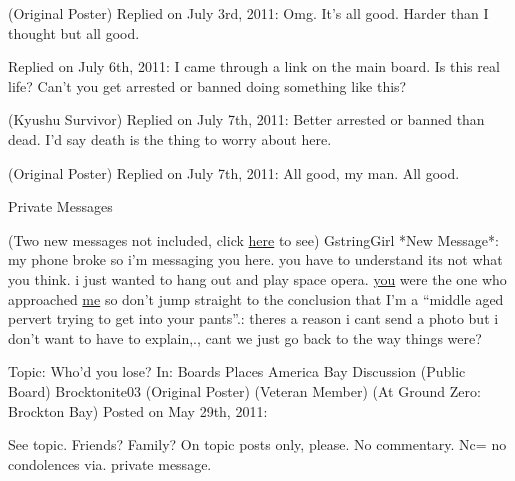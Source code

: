 \blacktriangleright  {}(Original Poster)
Replied on July 3rd, 2011:
Omg.
It's all good.
Harder than I thought but all good.



\blacktriangleright {}
Replied on July 6th, 2011:
I came through a link on the main board.  Is this real life?  Can't you get arrested or banned doing something like this?



\blacktriangleright {} (Kyushu Survivor)
Replied on July 7th, 2011:
Better arrested or banned than dead.  I'd say death is the thing to worry about here.



\blacktriangleright {}(Original Poster)
Replied on July 7th, 2011:
All good, my man.  All good.






\blacksquare



\blacklozenge  Private Messages



(Two new messages not included, click \underline{here} to see)
GstringGirl *New Message*:  my phone broke so i'm messaging you here. you have to understand its not what you think.  i just wanted to hang out and play space opera. \underline{you} were the one who approached \underline{me} so don't jump straight to the conclusion that I'm a ``middle aged pervert trying to get into your pants''.:  theres a reason i cant send a photo but i don't want to have to explain,.,  cant we just go back to the way things were?\frowny



\blacksquare



\blacklozenge  Topic:  Who'd you lose?
In:  Boards \blacktriangleright Places \blacktriangleright America \blacktrianglerightBrockton Bay Discussion (Public Board)
Brocktonite03 (Original Poster) (Veteran Member) (At Ground Zero: Brockton Bay)
Posted on May 29th, 2011:



See topic.  Friends?  Family?
On topic posts only, please.  No commentary.  Nc= no condolences via. private message.



